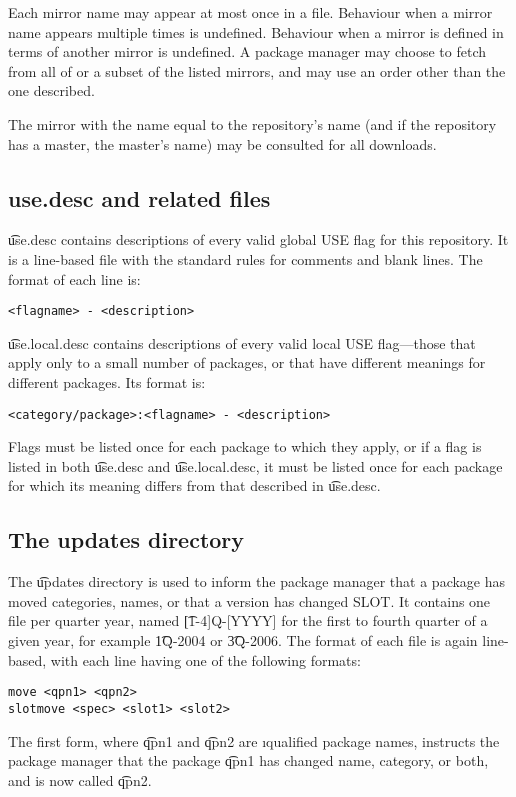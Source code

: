 Each mirror name may appear at most once in a file. Behaviour when a mirror name appears multiple
times is undefined. Behaviour when a mirror is defined in terms of another mirror is undefined. A
package manager may choose to fetch from all of or a subset of the listed mirrors, and may use an
order other than the one described.

The mirror with the name equal to the repository's name (and if the repository has a master,
the master's name) may be consulted for all downloads.

\subsection{use.desc and related files}
\label{use.desc}
\t{use.desc} contains descriptions of every valid global USE flag for this repository. It is a
line-based file with the standard rules for comments and blank lines. The format of each line is:
\begin{verbatim}
<flagname> - <description>
\end{verbatim}

\t{use.local.desc} contains descriptions of every valid local USE flag---those that apply only to a
small number of packages, or that have different meanings for different packages. Its format is:
\begin{verbatim}
<category/package>:<flagname> - <description>
\end{verbatim}
Flags must be listed once for each package to which they apply, or if a flag is listed in both
\t{use.desc} and \t{use.local.desc}, it must be listed once for each package for which its meaning
differs from that described in \t{use.desc}.

\subsection{The updates directory}
\label{updates-dir}
The \t{updates} directory is used to inform the package manager that a package has moved categories,
names, or that a version has changed SLOT. It contains one file per quarter year, named
\t{[1-4]Q-[YYYY]} for the first to fourth quarter of a given year, for example \t{1Q-2004} or
\t{3Q-2006}. The format of each file is again line-based, with each line having one of the following
formats:
\begin{verbatim}
move <qpn1> <qpn2>
slotmove <spec> <slot1> <slot2>
\end{verbatim}
The first form, where \t{qpn1} and \t{qpn2} are \i{qualified package names}, instructs the package
manager that the package \t{qpn1} has changed name, category, or both, and is now called \t{qpn2}.

